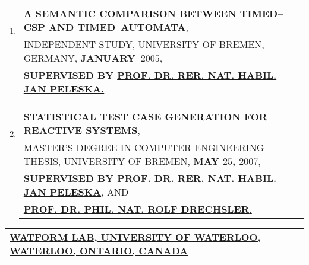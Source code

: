 \documentclass[9pt,a4paper]{article} %
\makeatletter
\newcommand{\headerrow}[2]
{\begin{tabular*}{\linewidth}{l@{\extracolsep{\fill}}r}
	#1 &
	#2 \\
\end{tabular*}}
\newcommand{\headerrowONE}[1]{\headerrow{#1}{}}
\makeatother
\begin{document}
\begin{enumerate}
\item \headerrowONE{\textbf{A SEMANTIC COMPARISON BETWEEN TIMED--CSP AND TIMED--AUTOMATA},\\
	INDEPENDENT STUDY, UNIVERSITY OF BREMEN, GERMANY, \textbf{JANUARY~$2005$},\\
	\textbf{SUPERVISED BY \href{http://www.informatik.uni-bremen.de/agbs/jp}
		{PROF. DR. RER. NAT. HABIL. JAN PELESKA.}}}
 
\item \headerrowONE{\textbf{STATISTICAL TEST CASE GENERATION FOR REACTIVE SYSTEMS},\\
	MASTER'S DEGREE IN COMPUTER ENGINEERING THESIS, UNIVERSITY OF BREMEN, \textbf{MAY $25$, $2007$},\\
	\textbf{SUPERVISED BY \href{http://www.informatik.uni-bremen.de/agbs/jp}{
	PROF. DR. RER. NAT. HABIL. JAN PELESKA}}, AND\\
	\href{http://www.rolfdrechsler.de}{\textbf{PROF. DR. PHIL. NAT. ROLF DRECHSLER}.}}
\end{enumerate}

\vspace{1em}

\headerrowONE{\href{http://watform.uwaterloo.ca}{
	\textbf{WATFORM LAB, UNIVERSITY OF WATERLOO, WATERLOO, ONTARIO, CANADA}}}

\vspace{0.3em}
\end{document}
